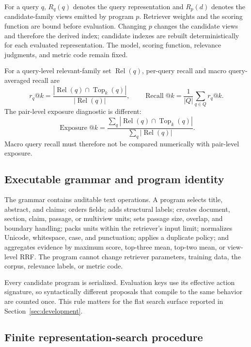 \documentclass[final,5p,times,twocolumn]{elsarticle}
\begin{document}
For a query \(q\), \(R_q(q)\) denotes the query representation and \(R_p(d)\)
denotes the candidate-family views emitted by program \(p\). Retriever weights
and the scoring function are bound before evaluation. Changing \(p\) changes
the candidate views and therefore the derived index; candidate indexes are
rebuilt deterministically for each evaluated representation. The model,
scoring function, relevance judgments, and metric code remain fixed.

For a query-level relevant-family set \(\operatorname{Rel}(q)\), per-query
recall and macro query-averaged recall are
\begin{equation}
 r_q@k=\frac{|\operatorname{Rel}(q)\cap\operatorname{Top}_k(q)|}
 {|\operatorname{Rel}(q)|},\qquad
 \operatorname{Recall}@k=\frac{1}{|Q|}\sum_{q\in Q}r_q@k .
\end{equation}
The pair-level exposure diagnostic is different:
\begin{equation}
 \operatorname{Exposure}@k=\frac{\sum_q|\operatorname{Rel}(q)\cap
 \operatorname{Top}_k(q)|}{\sum_q|\operatorname{Rel}(q)|}.
\end{equation}
Macro query recall must therefore not be compared numerically with pair-level
exposure.

\subsection{Executable grammar and program identity}

The grammar contains auditable text operations. A program selects title,
abstract, and claims; orders fields; adds structural labels; creates document,
section, claim, passage, or multiview units; sets passage size, overlap, and
boundary handling; packs units within the retriever's input limit; normalizes
Unicode, whitespace, case, and punctuation; applies a duplicate policy; and
aggregates evidence by maximum score, top-three mean, top-two mean, or
view-level RRF. The program cannot change retriever parameters, training data,
the corpus, relevance labels, or metric code.

Every candidate program is serialized. Evaluation keys use its effective
action signature, so syntactically different proposals that compile to the
same behavior are counted once. This rule matters for the flat search surface
reported in Section~\ref{sec:development}.

\subsection{Finite representation-search procedure}
\end{document}
